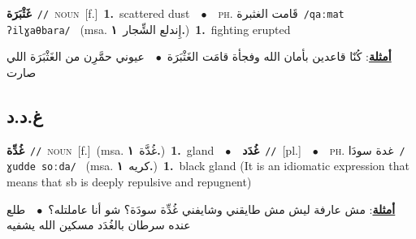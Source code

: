 \documentclass[10pt,a4paper,twoside]{article} %
\begin{document}
\begin{multicols}{2}
{\setlength\topsep{0pt}\textbf{\foreignlanguage{arabic}{غَثْبَرَة}}\ {\color{gray}\texttt{//}\color{black}}\ \textsc{noun}\ [f.]\ \textbf{1.}~scattered dust\ \ $\bullet$\ \ \textsc{ph.} \color{gray} \foreignlanguage{arabic}{قَامت الغثبرة}\color{black}\ {\color{gray}\texttt{/{\sffamily qaːmat ʔilɣaθbara}/}\color{black}}\ \color{gray} (msa. \foreignlanguage{arabic}{إِندلع الشِّجار}~\foreignlanguage{arabic}{\textbf{١.}})\color{black}\ \textbf{1.}~fighting erupted\  \begin{flushright}\color{gray}\foreignlanguage{arabic}{\textbf{\underline{\foreignlanguage{arabic}{أمثلة}}}: كُنّا قاعدين بأمان الله وفجأة قامَت الغَثْبَرَة\ $\bullet$\ \  عيوني حمَّرِن من الغَثْبَرَة اللي صارت}\end{flushright}\color{black}} \vspace{2mm}

\vspace{-3mm}
\subsection*{\color{blue}\foreignlanguage{arabic}{غ.د.د}\color{blue}{}} 

{\setlength\topsep{0pt}\textbf{\foreignlanguage{arabic}{غُدِّة}}\ {\color{gray}\texttt{//}\color{black}}\ \textsc{noun}\ [f.]\ \color{gray}(msa. \foreignlanguage{arabic}{غُدَّة}~\foreignlanguage{arabic}{\textbf{١.}})\color{black}\ \textbf{1.}~gland\ \ $\bullet$\ \ \setlength\topsep{0pt}\textbf{\foreignlanguage{arabic}{غُدَد}}\ {\color{gray}\texttt{//}\color{black}}\ [pl.]\ \ $\bullet$\ \ \textsc{ph.} \color{gray} \foreignlanguage{arabic}{غدة سودَا}\color{black}\ {\color{gray}\texttt{/{\sffamily ɣudde soːda}/}\color{black}}\ \color{gray} (msa. \foreignlanguage{arabic}{كريه}~\foreignlanguage{arabic}{\textbf{١.}})\color{black}\ \textbf{1.}~black gland (It is an idiomatic expression that means that sb is deeply repulsive and repugnent)\  \begin{flushright}\color{gray}\foreignlanguage{arabic}{\textbf{\underline{\foreignlanguage{arabic}{أمثلة}}}: مش عارفة ليش مش طايقني وشايفني غُدِّة سودَة؟ شو أنا عاملتله؟\ $\bullet$\ \  طلع عنده سرطان بالغُدَد مسكين الله يشفيه}\end{flushright}\color{black}} \vspace{2mm}


\end{multicols}
\end{document}
